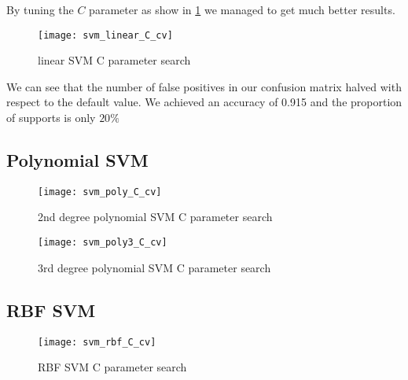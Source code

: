 
By tuning the $C$ parameter as show in \cref{fig:svm_linear_C_cv} we managed to get much better results.

\begin{figure}[H]
    \centering
    \texttt{[image: svm\_linear\_C\_cv]}
    \caption{linear SVM C parameter search}%
    \label{fig:svm_linear_C_cv}
\end{figure}


We can see that the number of false positives in our confusion matrix halved with respect to the
default value. We achieved an accuracy of 0.915 and the proportion of supports is only $20\%$




\subsection{Polynomial SVM}

\begin{figure}[H]
    \centering
    \texttt{[image: svm\_poly\_C\_cv]}
    \caption{2nd degree polynomial SVM C parameter search}%
    \label{fig:svm_poly_C_cv}
\end{figure}

\begin{figure}[H]
    \centering
    \texttt{[image: svm\_poly3\_C\_cv]}
    \caption{3rd degree polynomial SVM C parameter search}%
    \label{fig:svm_poly3_C_cv}
\end{figure}

\subsection{RBF SVM}

\begin{figure}[H]
    \centering
    \texttt{[image: svm\_rbf\_C\_cv]}
    \caption{RBF SVM C parameter search}%
    \label{fig:svm_rbf_C_cv}
\end{figure}
